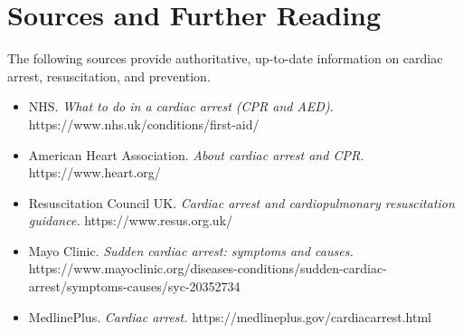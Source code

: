\section*{Sources and Further Reading}
The following sources provide authoritative, up-to-date information on cardiac arrest, resuscitation, and prevention.
\begin{itemize}
    \item NHS. \textit{What to do in a cardiac arrest (CPR and AED).} https://www.nhs.uk/conditions/first-aid/
    \item American Heart Association. \textit{About cardiac arrest and CPR.} https://www.heart.org/
    \item Resuscitation Council UK. \textit{Cardiac arrest and cardiopulmonary resuscitation guidance.} https://www.resus.org.uk/
    \item Mayo Clinic. \textit{Sudden cardiac arrest: symptoms and causes.} https://www.mayoclinic.org/diseases-conditions/sudden-cardiac-arrest/symptoms-causes/syc-20352734
    \item MedlinePlus. \textit{Cardiac arrest.} https://medlineplus.gov/cardiacarrest.html
\end{itemize}
